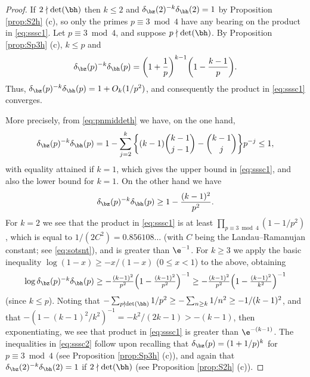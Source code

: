 \documentclass[12pt, reqno, twoside, letterpaper]{amsart}
\begin{document}
\begin{proof}
%
If $2 \nmid \det(\bh)$ then $k \le 2$ and 
$\delta_{\bz}(2)^{-k}\delta_{\bh}(2) = 1$ by 
Proposition \ref{prop:S2h} (c), so only the primes 
$p \equiv 3 \bmod 4$ have any bearing on the product in 
\eqref{eq:sssc1}.
%
Let $p \equiv 3 \bmod 4$, and suppose $p \nmid \det(\bh)$.
%
By Proposition \ref{prop:Sp3h} (c), $k \le p$ and 
\begin{equation}
 \label{eq:pnmiddeth}
  \delta_{\bz}(p)^{-k}\delta_{\bh}(p)
   =
    \bigg(1 + \frac{1}{p}\bigg)^{k - 1}
     \bigg(1 - \frac{k - 1}{p}\bigg).
\end{equation}
%
Thus, $\delta_{\bz}(p)^{-k}\delta_{\bh}(p) = 1 + O_k(1/p^2)$, and 
consequently the product in \eqref{eq:sssc1} converges.

More precisely, from \eqref{eq:pnmiddeth} we have, on the one 
hand,  
\[
  \delta_{\bz}(p)^{-k}\delta_{\bh}(p)
   =
    1 
    - 
     \sum_{j = 2}^k 
      \bigg\{
       (k - 1)\binom{k - 1}{j - 1} - \binom{k - 1}{j}
      \bigg\}
      p^{-j}
       \le 
        1,
\]
with equality attained if $k = 1$, which gives the upper bound in 
\eqref{eq:sssc1}, and also the lower bound for $k = 1$.
%
On the other hand we have
\[
 \delta_{\bz}(p)^{-k}\delta_{\bh}(p)
  \ge 
   1 - \frac{(k - 1)^2}{p^2}.
\]
%
For $k = 2$ we see that the product in \eqref{eq:sssc1} is at 
least $\prod_{p \equiv 3 \bmod 4}(1 - 1/p^2)$, which is equal to 
$1/(2C^2) = 0.856108\ldots$ (with $C$ being the Landau--Ramanujan 
constant; see \eqref{eq:sotsnt}), and is 
greater than $\e^{-1}$.
%
For $k \ge 3$ we apply the basic inequality 
$\log(1 - x) \ge -x/(1 - x)$ ($0 \le x < 1$) to the above, 
obtaining 
\[
 \textstyle 
 \log \delta_{\bz}(p)^{-k}\delta_{\bh}(p)
  \ge 
  -\frac{(k - 1)^2}{p^2}\Big(1 - \frac{(k - 1)^2}{p^2}\Big)^{-1}
    \ge
   - \frac{(k - 1)^2}{p^2}\Big(1 - \frac{(k - 1)^2}{k^2}\Big)^{-1}
\]
(since $k \le p$).
%
Noting that  
$
 -\sum_{p \nmid \det(\bh)} 1/p^2
  \ge 
   -\sum_{n \ge k} 1/n^2
    \ge 
     -1/(k - 1)^2
$,
and that  
$-(1 - (k - 1)^2/k^2)^{-1} = -k^2/(2k - 1) > -(k - 1)$, then 
exponentiating, we see that product in \eqref{eq:sssc1} is greater 
than $\e^{-(k - 1)}$.
%
The inequalities in \eqref{eq:sssc2} follow upon recalling that 
$\delta_{\bz}(p) = (1 + 1/p)^k$ for $p \equiv 3 \bmod 4$ (see 
Proposition \ref{prop:Sp3h} (c)), and again that 
$\delta_{\bz}(2)^{-k}\delta_{\bh}(2) = 1$ if $2 \nmid \det(\bh)$ 
(see Proposition \ref{prop:S2h} (c)).
\end{proof}

\end{document}
